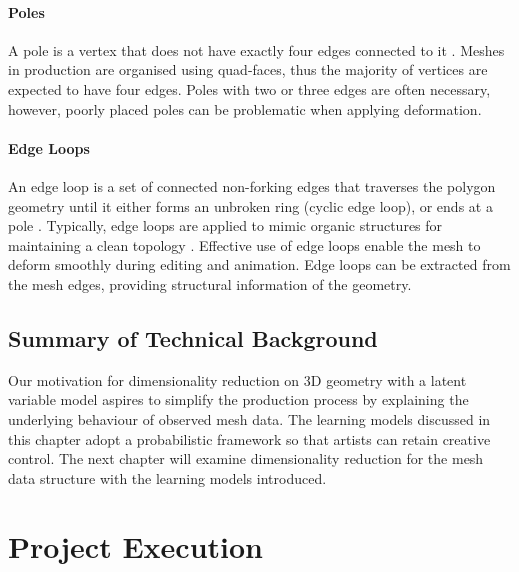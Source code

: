 \documentclass[ %
author={Dillon Keith Diep},
supervisor={Dr. Carl Henrik Ek},
degree={MEng},
title={ART-CG Hair:},
subtitle={Assisted Real-time Content Generation of Stylised Virtual Hair},
type={Research},
year={2017} ]{dissertation}
\begin{document}
\subsubsection{Poles}
A pole is a vertex that does not have exactly four edges connected to it \cite[p.92]{blenderstudio}. Meshes in production are organised using quad-faces, thus the majority of vertices are expected to have four edges. Poles with two or three edges are often necessary, however, poorly placed poles can be problematic when applying deformation.

\subsubsection{Edge Loops}
An edge loop is a set of connected non-forking edges that traverses the polygon geometry until it either forms an unbroken ring (cyclic edge loop), or ends at a pole \cite[p.93]{blenderstudio}. Typically, edge loops are applied to mimic organic structures for maintaining a clean topology \cite[pp.10-12]{edgeloops}. Effective use of edge loops enable the mesh to deform smoothly during editing and animation. Edge loops can be extracted from the mesh edges, providing structural information of the geometry.

\section{Summary of Technical Background}
Our motivation for dimensionality reduction on 3D geometry with a latent variable model aspires to simplify the production process by explaining the underlying behaviour of observed mesh data. The learning models discussed in this chapter adopt a probabilistic framework so that artists can retain creative control. The next chapter will examine dimensionality reduction for the mesh data structure with the learning models introduced.

\chapter{Project Execution}
\label{chap:execution}
\end{document}
